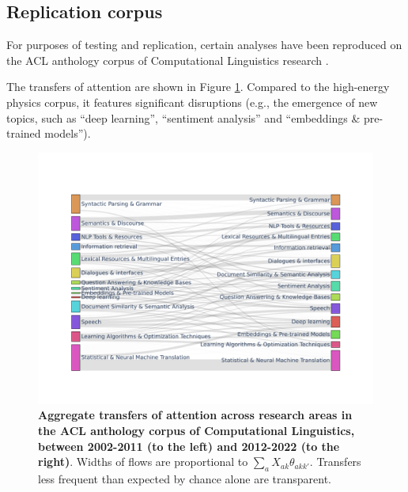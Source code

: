 \documentclass{article}
\begin{document}
\subsection{\label{appendix:hep_vs_acl}Replication corpus}

For purposes of testing and replication, certain analyses have been reproduced on the ACL anthology corpus of Computational Linguistics research .

The transfers of attention are shown in Figure \ref{fig:sankey_acl}. Compared to the high-energy physics corpus, it features significant disruptions (e.g., the emergence of new topics, such as ``deep learning'', ``sentiment analysis'' and ``embeddings \& pre-trained models'').

 \begin{figure}[h]
     \centering
     \includegraphics[width=\textwidth]{Fig20.pdf}
     \caption{\textbf{Aggregate transfers of attention across research areas in the ACL anthology corpus of Computational Linguistics, between 2002-2011 (to the left) and 2012-2022 (to the right)}. Widths of flows are proportional to $\sum_a X_{ak}\theta_{akk'}$. Transfers less frequent than expected by chance alone are transparent. }
     \label{fig:sankey_acl}
 \end{figure}

\end{document}
